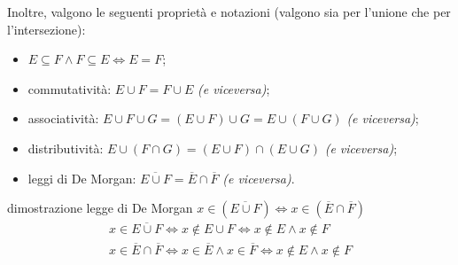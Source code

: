 \noindent Inoltre, valgono le seguenti proprietà e notazioni (valgono sia per l'unione che per l'intersezione): \begin{itemize}
    \item $E \subseteq F \land F \subseteq E \Leftrightarrow E = F$;
    \item commutatività: $E \cup F = F \cup E$ \textit{(e viceversa)};
    \item associatività: $E \cup F \cup G = (E \cup F) \cup G = E \cup (F \cup G)$ \textit{(e viceversa)};
    \item distributività: $E \cup (F \cap G) = (E \cup F) \cap (E \cup G)$ \textit{(e viceversa)};
    \item leggi di De Morgan: $\overline{E \cup F} = \overline E \cap \overline F$ \textit{(e viceversa)}.
\end{itemize}

\begin{dimostrazione} dimostrazione legge di De Morgan $x \in (\overline{E \cup F}) \Leftrightarrow x \in (\overline{E} \cap \overline{F})$
\begin{align} 
    x \in \overline{E \cup F} \Leftrightarrow x \notin E \cup F \Leftrightarrow x \notin E \land x \notin F \\
    x \in \overline{E} \cap \overline{F} \Leftrightarrow x \in \overline{E} \land x \in \overline{F} \Leftrightarrow x \notin E \land x \notin F
\end{align}
\end{dimostrazione}



